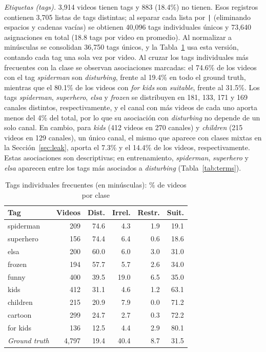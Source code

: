 \documentclass[conference]{IEEEtran}
\begin{document}
\textit{Etiquetas (tags).} 3,914 videos tienen tags y 883 (18.4\%) no tienen. Esos registros contienen 3,705 listas de tags distintas; al separar cada lista por \texttt{|} (eliminando espacios y cadenas vacías) se obtienen 40,096 tags individuales únicos y 73,640 asignaciones en total (18.8 tags por video en promedio). Al normalizar a minúsculas se consolidan 36,750 tags únicos, y la Tabla~\ref{tab:tags} usa esta versión, contando cada tag una sola vez por video. Al cruzar los tags individuales más frecuentes con la clase se observan asociaciones marcadas: el 74.6\% de los videos con el tag \textit{spiderman} son \textit{disturbing}, frente al 19.4\% en todo el ground truth, mientras que el 80.1\% de los videos con \textit{for kids} son \textit{suitable}, frente al 31.5\%. Los tags \textit{spiderman}, \textit{superhero}, \textit{elsa} y \textit{frozen} se distribuyen en 181, 133, 171 y 169 canales distintos, respectivamente, y el canal con más videos de cada uno aporta menos del 4\% del total, por lo que su asociación con \textit{disturbing} no depende de un solo canal. En cambio, para \textit{kids} (412 videos en 270 canales) y \textit{children} (215 videos en 129 canales), un único canal, el mismo que aparece con clases mixtas en la Sección~\ref{sec:leak}, aporta el 7.3\% y el 14.4\% de los videos, respectivamente. Estas asociaciones son descriptivas; en entrenamiento, \textit{spiderman}, \textit{superhero} y \textit{elsa} aparecen entre los tags más asociados a \textit{disturbing} (Tabla~\ref{tab:terms}).

\begin{table}[!t]
\caption{Tags individuales frecuentes (en minúsculas): \% de videos por clase}
\begin{center}
\footnotesize
\setlength{\tabcolsep}{3pt}
\begin{tabular}{|l|r|r|r|r|r|}
\hline
\textbf{Tag} & \textbf{Videos} & \textbf{Dist.} & \textbf{Irrel.} & \textbf{Restr.} & \textbf{Suit.} \\
\hline
spiderman & 209 & 74.6 & 4.3 & 1.9 & 19.1 \\
\hline
superhero & 156 & 74.4 & 6.4 & 0.6 & 18.6 \\
\hline
elsa & 200 & 60.0 & 6.0 & 3.0 & 31.0 \\
\hline
frozen & 194 & 57.7 & 5.7 & 2.6 & 34.0 \\
\hline
funny & 400 & 39.5 & 19.0 & 6.5 & 35.0 \\
\hline
kids & 412 & 31.1 & 4.6 & 1.2 & 63.1 \\
\hline
children & 215 & 20.9 & 7.9 & 0.0 & 71.2 \\
\hline
cartoon & 299 & 24.7 & 2.7 & 0.3 & 72.2 \\
\hline
for kids & 136 & 12.5 & 4.4 & 2.9 & 80.1 \\
\hline
\textit{Ground truth} & 4,797 & 19.4 & 40.4 & 8.7 & 31.5 \\
\hline
\end{tabular}
\label{tab:tags}
\end{center}
\end{table}
\end{document}
